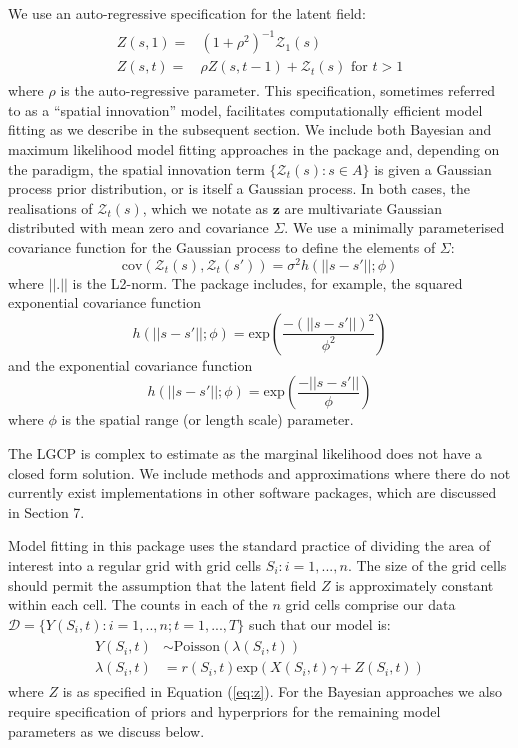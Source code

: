 We use an auto-regressive specification for the latent field:
\begin{align}
\begin{split}
\label{eq:z}
 Z(s,1) =& (1+\rho^2)^{-1}\mathcal{Z}_1(s)\\
 Z(s,t) =& \rho Z(s,t-1) + \mathcal{Z}_t(s) \text{   for } t>1
 \end{split}
\end{align}
where $\rho$ is the auto-regressive parameter. This specification, sometimes referred to as a ``spatial innovation'' model, facilitates computationally efficient model fitting as we describe in the subsequent section. We include both Bayesian and maximum likelihood model fitting approaches in the package and, depending on the paradigm, the spatial innovation term $\{ \mathcal{Z}_t(s): s\in A \}$ is given a Gaussian process prior distribution, or is itself a Gaussian process. In both cases, the realisations of $\mathcal{Z}_t(s)$, which we notate as $\mathbf{z}$ are multivariate Gaussian distributed with mean zero and covariance $\Sigma$. We use a minimally parameterised covariance function for the Gaussian process to define the elements of $\Sigma$:
\begin{equation}
\text{cov}(\mathcal{Z}_t(s),\mathcal{Z}_t(s')) = \sigma^2 h(||s-s'||; \phi)
\end{equation}
where $||.||$ is the L2-norm. The package includes, for example, the squared exponential covariance function
\begin{equation}
h(||s-s'||;\phi) = \text{exp}\left( \frac{-(||s-s'||)^2}{\phi^2} \right)
\end{equation}
and the exponential covariance function
\begin{equation}
h(||s-s'||;\phi) = \text{exp}\left( \frac{-||s-s'||}{\phi} \right)
\end{equation}
where $\phi$ is the spatial range (or length scale) parameter.

The LGCP is complex to estimate as the marginal likelihood does not have a closed form solution. We include methods and approximations where there do not currently exist implementations in other software packages, which are discussed in Section 7.

Model fitting in this package uses the standard practice of dividing the area of interest into a regular grid \citep{Diggle2013,Taylor2013,Taylor2015} with grid cells $S_i:i = 1,...,n$. The size of the grid cells should permit the assumption that the latent field $Z$ is approximately constant within each cell. The counts in each of the $n$ grid cells comprise our data $\mathcal{D} = \{Y(S_i,t):i=1,..,n;t=1,...,T\}$ such that our model is:
\begin{align}
\begin{split}
\label{eq:fullmodel}
    Y(S_i,t) &\sim \text{Poisson}(\lambda(S_i,t)) \\
    \lambda(S_i,t) &= r(S_i,t)\text{exp}(X(S_i,t)\gamma + Z(S_i,t)) 
    \end{split}
\end{align}
where $Z$ is as specified in Equation (\ref{eq:z}). For the Bayesian approaches we also require specification of priors and hyperpriors for the remaining model parameters as we discuss below. 

